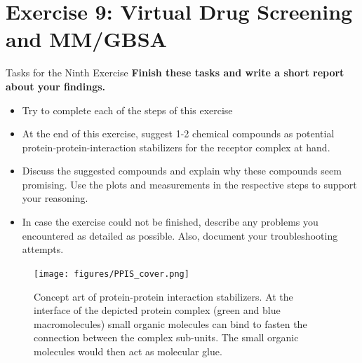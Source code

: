\documentclass[9pt,tutorial]{livecoms}
\begin{document}
\newpage

\section{Exercise 9: Virtual Drug Screening and MM/GBSA}\label{sec:CompDrugDesign}
\begin{Checklists}
    \begin{checklist}{Tasks for the Ninth Exercise}
    \textbf{Finish these tasks and write a short report about your findings.}
    \begin{itemize}
		\item Try to complete each of the steps of this exercise
		\item At the end of this exercise, suggest 1-2 chemical compounds as potential protein-protein-interaction stabilizers for the receptor complex at hand.
		\item Discuss the suggested compounds and explain why these compounds seem promising. Use the plots and measurements in the respective steps to support your reasoning.
		\item In case the exercise could not be finished, describe any problems you encountered as detailed as possible. Also, document your troubleshooting attempts.
	\end{itemize} 
    \end{checklist}
\end{Checklists}
\begin{figure}[H]
    \centering
    \texttt{[image: figures/PPIS\_cover.png]}
    \caption{Concept art of protein-protein interaction stabilizers. At the interface of the depicted protein complex (green and blue macromolecules) small organic molecules can bind to fasten the connection between the complex sub-units. The small organic molecules would then act as molecular glue.}
    \label{fig:PPIS_cover}
\end{figure}

\end{document}
